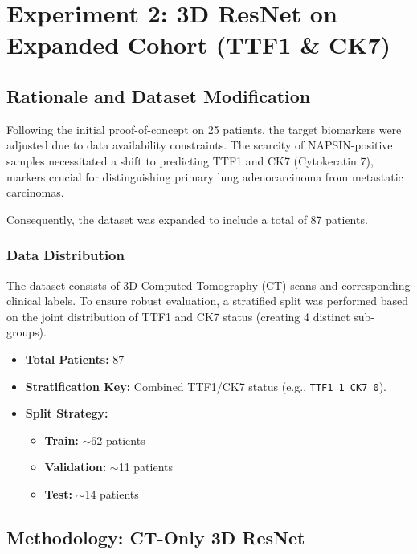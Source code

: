 \usepackage{float}      %
\usepackage{subcaption}
\section{Experiment 2: 3D ResNet on Expanded Cohort (TTF1 \& CK7)}

\subsection{Rationale and Dataset Modification}
Following the initial proof-of-concept on 25 patients, the target biomarkers were adjusted due to data availability constraints. The scarcity of NAPSIN-positive samples necessitated a shift to predicting TTF1 and CK7 (Cytokeratin 7), markers crucial for distinguishing primary lung adenocarcinoma from metastatic carcinomas.

Consequently, the dataset was expanded to include a total of 87 patients.

\subsubsection{Data Distribution}
The dataset consists of 3D Computed Tomography (CT) scans and corresponding clinical labels. To ensure robust evaluation, a stratified split was performed based on the joint distribution of TTF1 and CK7 status (creating 4 distinct sub-groups).

\begin{itemize}
    \item \textbf{Total Patients:} 87
    \item \textbf{Stratification Key:} Combined TTF1/CK7 status (e.g., \texttt{TTF1\_1\_CK7\_0}).
    \item \textbf{Split Strategy:}
    \begin{itemize}
        \item \textbf{Train:} $\sim$62 patients
        \item \textbf{Validation:} $\sim$11 patients
        \item \textbf{Test:} $\sim$14 patients
    \end{itemize}
\end{itemize}

\subsection{Methodology: CT-Only 3D ResNet}

